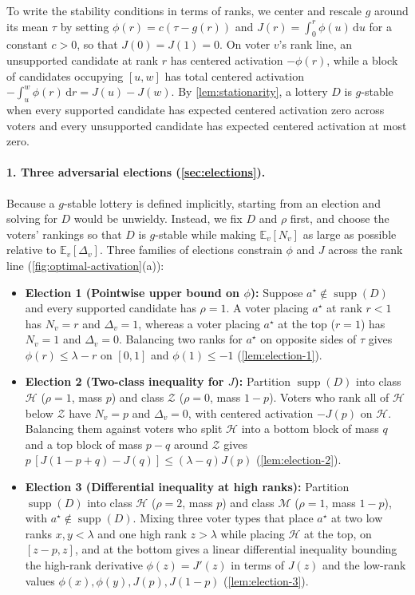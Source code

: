 \documentclass[11pt]{article}
\numberwithin{equation}{section}
\theoremstyle{plain}
\theoremstyle{definition}
\newcommand{\E}{\mathbb{E}}
\newcommand{\1}{\mathbf{1}}
\newcommand{\supp}{\operatorname{supp}}
\newcommand{\calH}{\mathcal{H}}
\newcommand{\calM}{\mathcal{M}}
\newcommand{\calZ}{\mathcal{Z}}
\begin{document}
To write the stability conditions in terms of ranks, we center and rescale $g$ around its mean $\tau$ by setting $\phi(r) = c(\tau - g(r))$ and $J(r) = \int_0^r \phi(u)\,\mathrm{d}u$ for a constant $c > 0$, so that $J(0) = J(1) = 0$. On voter $v$'s rank line, an unsupported candidate at rank $r$ has centered activation $-\phi(r)$, while a block of candidates occupying $[u, w]$ has total centered activation $-\int_u^w \phi(r)\,\mathrm{d}r = J(u) - J(w)$. By \cref{lem:stationarity}, a lottery $D$ is $g$-stable when every supported candidate has expected centered activation zero across voters and every unsupported candidate has expected centered activation at most zero.

\paragraph{1. Three adversarial elections (\cref{sec:elections}).}
Because a $g$-stable lottery is defined implicitly, starting from an election and solving for $D$ would be unwieldy. Instead, we fix $D$ and $\rho$ first, and choose the voters' rankings so that $D$ is $g$-stable while making $\E_v[N_v]$ as large as possible relative to $\E_v[\Delta_v]$. Three families of elections constrain $\phi$ and $J$ across the rank line (\cref{fig:optimal-activation}(a)):
\begin{itemize}
  \item \textbf{Election 1 (Pointwise upper bound on $\phi$):} Suppose $a^\star \notin \supp(D)$ and every supported candidate has $\rho = 1$. A voter placing $a^\star$ at rank $r < 1$ has $N_v = r$ and $\Delta_v = 1$, whereas a voter placing $a^\star$ at the top ($r = 1$) has $N_v = 1$ and $\Delta_v = 0$. Balancing two ranks for $a^\star$ on opposite sides of $\tau$ gives $\phi(r) \le \lambda - r$ on $[0, 1]$ and $\phi(1) \le -1$ (\cref{lem:election-1}).
  \item \textbf{Election 2 (Two-class inequality for $J$):} Partition $\supp(D)$ into class $\calH$ ($\rho = 1$, mass $p$) and class $\calZ$ ($\rho = 0$, mass $1 - p$). Voters who rank all of $\calH$ below $\calZ$ have $N_v = p$ and $\Delta_v = 0$, with centered activation $-J(p)$ on $\calH$. Balancing them against voters who split $\calH$ into a bottom block of mass $q$ and a top block of mass $p - q$ around $\calZ$ gives $p\,[J(1 - p + q) - J(q)] \le (\lambda - q)J(p)$ (\cref{lem:election-2}).
  \item \textbf{Election 3 (Differential inequality at high ranks):} Partition $\supp(D)$ into class $\calH$ ($\rho = 2$, mass $p$) and class $\calM$ ($\rho = 1$, mass $1 - p$), with $a^\star \notin \supp(D)$. Mixing three voter types that place $a^\star$ at two low ranks $x, y < \lambda$ and one high rank $z > \lambda$ while placing $\calH$ at the top, on $[z - p, z]$, and at the bottom gives a linear differential inequality bounding the high-rank derivative $\phi(z) = J'(z)$ in terms of $J(z)$ and the low-rank values $\phi(x), \phi(y), J(p), J(1 - p)$ (\cref{lem:election-3}).
\end{itemize}
\end{document}
